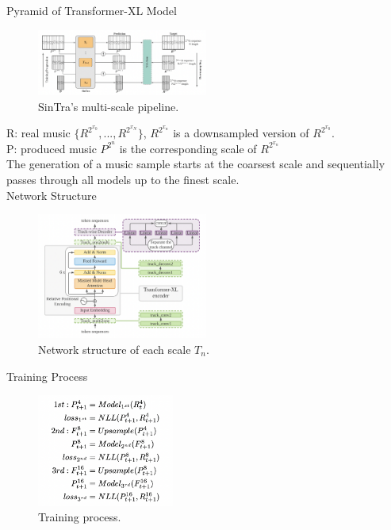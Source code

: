 \documentclass{article}
\begin{document}
\noindent
Pyramid of Transformer-XL Model
\begin{figure}[H]
	\centerline{
   \includegraphics[width=0.5\textwidth]{Fig9.png}}
   \caption{SinTra's multi-scale pipeline.}
   \label{fig:example}
\end{figure}
\noindent
R: real music $\{R^{2^{x_0}}, ..., R^{2^{x_N}}\}$, $R^{2^{x_n}}$ is a downsampled version of $R^{2^{x_0}}$.\\
P: produced music $P^{2^n}$ is the corresponding scale of $R^{2^{x_n}}$\\
The generation of a music sample starts at the coarsest scale and sequentially passes through all models up to the finest scale.\\

\noindent
Network Structure
\begin{figure}[H]
	\centerline{
   \includegraphics[width=0.5\textwidth]{Fig10.png}}
   \caption{Network structure of each scale $T_n$.}
   \label{fig:example}
\end{figure}
\noindent
Training Process
\begin{figure}[H]
	\centerline{
   \includegraphics[width=0.4\textwidth]{Fig11.png}}
   \caption{Training process.}
   \label{fig:example}
\end{figure}
\end{document}
